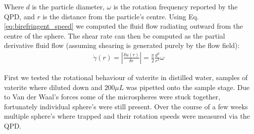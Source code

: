 Where $d$ is the particle diameter, $\omega$ is the rotation frequency
reported by the QPD, and $r$ is the distance from the particle's centre. 
Using Eq.\ref{eq:birefringent_speed} we computed the fluid flow radiating
outward from the centre of the sphere. The shear rate can then be computed
as the partial derivative fluid flow (assuming shearing is generated purely
by the flow field):
\begin{align}
	\label{eq:birefringent_shear}
	\dot{\gamma}(r)=\left|\frac{\delta u(r)}{\delta r} \right|= \frac{\pi}{2}\frac{d^3}{r^3}\omega
\end{align}

First we tested the rotational behaviour of vaterite in distilled water, 
samples of vaterite where diluted down and $200\mu L$ was pipetted onto
the sample stage. Due to Van der Waal's forces some of the microspheres 
were stuck together, fortunately individual sphere's were still present.
Over the course of a few weeks multiple sphere's where trapped 
and their rotation speeds were measured via the QPD. 
